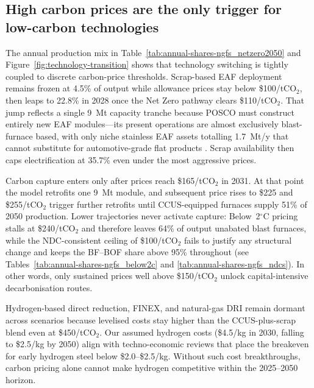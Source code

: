 \documentclass[preprint,1p,authoryear]{elsarticle}
\begin{document}
\subsection{High carbon prices are the only trigger for low-carbon technologies}

The annual production mix in Table~\ref{tab:annual-shares-ngfs_netzero2050} and Figure~\ref{fig:technology-transition} shows that technology switching is tightly coupled to discrete carbon-price thresholds. Scrap-based EAF deployment remains frozen at 4.5\% of output while allowance prices stay below \$100/tCO$_2$, then leaps to 22.8\% in 2028 once the Net Zero pathway clears \$110/tCO$_2$. That jump reflects a single 9~Mt capacity tranche because POSCO must construct entirely new EAF modules—its present operations are almost exclusively blast-furnace based, with only niche stainless EAF assets totalling 1.7~Mt/y that cannot substitute for automotive-grade flat products \citep{POSCO2023SR}. Scrap availability then caps electrification at 35.7\% even under the most aggressive prices.

Carbon capture enters only after prices reach \$165/tCO$_2$ in 2031. At that point the model retrofits one 9~Mt module, and subsequent price rises to \$225 and \$255/tCO$_2$ trigger further retrofits until CCUS-equipped furnaces supply 51\% of 2050 production. Lower trajectories never activate capture: Below~2$^\circ$C pricing stalls at \$240/tCO$_2$ and therefore leaves 64\% of output unabated blast furnaces, while the NDC-consistent ceiling of \$100/tCO$_2$ fails to justify any structural change and keeps the BF--BOF share above 95\% throughout (see Tables~\ref{tab:annual-shares-ngfs_below2c} and \ref{tab:annual-shares-ngfs_ndcs}). In other words, only sustained prices well above \$150/tCO$_2$ unlock capital-intensive decarbonisation routes.

Hydrogen-based direct reduction, FINEX, and natural-gas DRI remain dormant across scenarios because levelised costs stay higher than the CCUS-plus-scrap blend even at \$450/tCO$_2$. Our assumed hydrogen costs (\$4.5/kg in 2030, falling to \$2.5/kg by 2050) align with techno-economic reviews \citep{MaterialEconomics2019,demailly2018european} that place the breakeven for early hydrogen steel below \$2.0--\$2.5/kg. Without such cost breakthroughs, carbon pricing alone cannot make hydrogen competitive within the 2025--2050 horizon.
\end{document}
